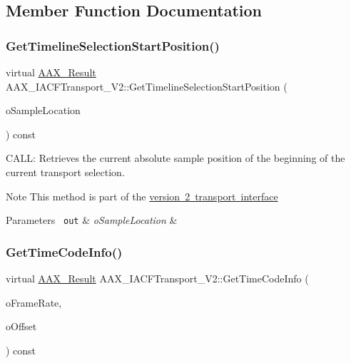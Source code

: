 \subsection{Member Function Documentation}
\mbox{\label{a01761_a2ed1e7eb242706350126e1f0f80ef89a}} 
\subsubsection{\texorpdfstring{GetTimelineSelectionStartPosition()}{GetTimelineSelectionStartPosition()}}
{\footnotesize\ttfamily virtual \mbox{\hyperlink{a00392_a4d8f69a697df7f70c3a8e9b8ee130d2f}{A\+A\+X\+\_\+\+Result}} A\+A\+X\+\_\+\+I\+A\+C\+F\+Transport\+\_\+\+V2\+::\+Get\+Timeline\+Selection\+Start\+Position (\begin{DoxyParamCaption}\item[{int64\+\_\+t $\ast$}]{o\+Sample\+Location }\end{DoxyParamCaption}) const\hspace{0.3cm}{\ttfamily [pure virtual]}}



C\+A\+LL\+: Retrieves the current absolute sample position of the beginning of the current transport selection. 

\begin{DoxyNote}{Note}
This method is part of the \mbox{\hyperlink{a01761}{version 2 transport interface}}
\end{DoxyNote}

\begin{DoxyParams}[1]{Parameters}
\mbox{\texttt{ out}}  & {\em o\+Sample\+Location} & \\
\hline
\end{DoxyParams}
\mbox{\label{a01761_a3190f47a60f2b99d3a6b904f0eada0bf}} 
\subsubsection{\texorpdfstring{GetTimeCodeInfo()}{GetTimeCodeInfo()}}
{\footnotesize\ttfamily virtual \mbox{\hyperlink{a00392_a4d8f69a697df7f70c3a8e9b8ee130d2f}{A\+A\+X\+\_\+\+Result}} A\+A\+X\+\_\+\+I\+A\+C\+F\+Transport\+\_\+\+V2\+::\+Get\+Time\+Code\+Info (\begin{DoxyParamCaption}\item[{\mbox{\hyperlink{a00491_a1271a51553bf508de59864334111aa8f}{A\+A\+X\+\_\+\+E\+Frame\+Rate}} $\ast$}]{o\+Frame\+Rate,  }\item[{int32\+\_\+t $\ast$}]{o\+Offset }\end{DoxyParamCaption}) const\hspace{0.3cm}{\ttfamily [pure virtual]}}




